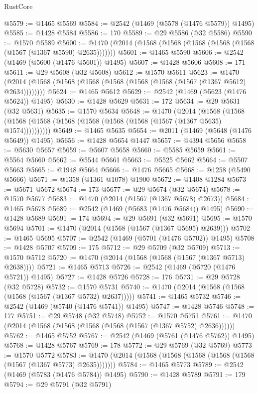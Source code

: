 \begin{lexlean}{RustCore}
\begin{coremodule}
{\begin{coremodule}
{{{{{{{{{{{{{{{{{{{{{{{{{{{{{{{{{{{{{{{{{{{{{{{@5579 := @1465 @5569
@5584 := @2542 (@1469 (@5578 (@1476 @5579)) @1495)
@5585 := @1428 @5584
@5586 := 170
@5589 := @29 @5586 (@32 @5586)
@5590 := @1570 @5589
@5600 := @1470 (@2014 (@1568 (@1568 (@1568 (@1568 (@1568 (@1567 (@1367 @5590) @2635)))))))
@5601 := @1465 @5590
@5606 := @2542 (@1469 (@5600 (@1476 @5601)) @1495)
@5607 := @1428 @5606
@5608 := 171
@5611 := @29 @5608 (@32 @5608)
@5612 := @1570 @5611
@5623 := @1470 (@2014 (@1568 (@1568 (@1568 (@1568 (@1568 (@1568 (@1567 (@1367 @5612) @2634))))))))
@5624 := @1465 @5612
@5629 := @2542 (@1469 (@5623 (@1476 @5624)) @1495)
@5630 := @1428 @5629
@5631 := 172
@5634 := @29 @5631 (@32 @5631)
@5635 := @1570 @5634
@5648 := @1470
    (@2014
      (@1568 (@1568 (@1568 (@1568 (@1568 (@1568 (@1568 (@1568 (@1567 (@1367 @5635) @1574))))))))))
@5649 := @1465 @5635
@5654 := @2011 (@1469 (@5648 (@1476 @5649)) @1495)
@5656 := @1428 @5654 @1447
@5657 := @4394 @5656
@5658 := @5630 @5657
@5659 := @5607 @5658
@5660 := @5585 @5659
@5661 := @5564 @5660
@5662 := @5544 @5661
@5663 := @5525 @5662
@5664 := @5507 @5663
@5665 := @1948 @5664
@5666 := @1476 @5665
@5668 := @1258 (@5490 @5666)
@5671 := @1358 (@1361 @1078) @1900
@5672 := @1408 @1284
@5673 := @5671 @5672
@5674 := 173
@5677 := @29 @5674 (@32 @5674)
@5678 := @1570 @5677
@5683 := @1470 (@2014 (@1567 (@1367 @5678) @2673))
@5684 := @1465 @5678
@5689 := @2542 (@1469 (@5683 (@1476 @5684)) @1495)
@5690 := @1428 @5689
@5691 := 174
@5694 := @29 @5691 (@32 @5691)
@5695 := @1570 @5694
@5701 := @1470 (@2014 (@1568 (@1567 (@1367 @5695) @2639)))
@5702 := @1465 @5695
@5707 := @2542 (@1469 (@5701 (@1476 @5702)) @1495)
@5708 := @1428 @5707
@5709 := 175
@5712 := @29 @5709 (@32 @5709)
@5713 := @1570 @5712
@5720 := @1470 (@2014 (@1568 (@1568 (@1567 (@1367 @5713) @2638))))
@5721 := @1465 @5713
@5726 := @2542 (@1469 (@5720 (@1476 @5721)) @1495)
@5727 := @1428 @5726
@5728 := 176
@5731 := @29 @5728 (@32 @5728)
@5732 := @1570 @5731
@5740 := @1470 (@2014 (@1568 (@1568 (@1568 (@1567 (@1367 @5732) @2637)))))
@5741 := @1465 @5732
@5746 := @2542 (@1469 (@5740 (@1476 @5741)) @1495)
@5747 := @1428 @5746
@5748 := 177
@5751 := @29 @5748 (@32 @5748)
@5752 := @1570 @5751
@5761 := @1470 (@2014 (@1568 (@1568 (@1568 (@1568 (@1567 (@1367 @5752) @2636))))))
@5762 := @1465 @5752
@5767 := @2542 (@1469 (@5761 (@1476 @5762)) @1495)
@5768 := @1428 @5767
@5769 := 178
@5772 := @29 @5769 (@32 @5769)
@5773 := @1570 @5772
@5783 := @1470 (@2014 (@1568 (@1568 (@1568 (@1568 (@1568 (@1567 (@1367 @5773) @2635)))))))
@5784 := @1465 @5773
@5789 := @2542 (@1469 (@5783 (@1476 @5784)) @1495)
@5790 := @1428 @5789
@5791 := 179
@5794 := @29 @5791 (@32 @5791)
}}}}}}}}}}}}}}}}}}}}}}}}}}}}}}}}}}}}}}}}}}}}}}}
\end{coremodule}}
\end{coremodule}
\end{lexlean}
